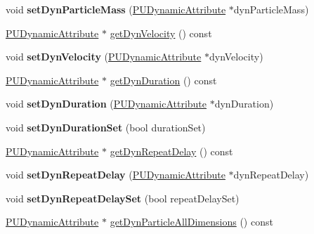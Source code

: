 \begin{DoxyCompactItemize}
\mbox{\label{classPUEmitter_a7bf6c32faf96c75508faa4e94ba8dc62}} 
void {\bfseries set\+Dyn\+Particle\+Mass} (\hyperlink{classPUDynamicAttribute}{P\+U\+Dynamic\+Attribute} $\ast$dyn\+Particle\+Mass)
\item 
\hyperlink{classPUDynamicAttribute}{P\+U\+Dynamic\+Attribute} $\ast$ \hyperlink{classPUEmitter_afebcabddaaa921223bc58a5feffa0e60}{get\+Dyn\+Velocity} () const
\item 
\mbox{\label{classPUEmitter_a68a3f8e9d491aa0468d6a2faba143329}} 
void {\bfseries set\+Dyn\+Velocity} (\hyperlink{classPUDynamicAttribute}{P\+U\+Dynamic\+Attribute} $\ast$dyn\+Velocity)
\item 
\hyperlink{classPUDynamicAttribute}{P\+U\+Dynamic\+Attribute} $\ast$ \hyperlink{classPUEmitter_a08f852003ae3d3532df40b1425b3466e}{get\+Dyn\+Duration} () const
\item 
\mbox{\label{classPUEmitter_a4165cc4319f111235e860ef4d59423b2}} 
void {\bfseries set\+Dyn\+Duration} (\hyperlink{classPUDynamicAttribute}{P\+U\+Dynamic\+Attribute} $\ast$dyn\+Duration)
\item 
\mbox{\label{classPUEmitter_ac270698dbad1b6d1ae466d694f943441}} 
void {\bfseries set\+Dyn\+Duration\+Set} (bool duration\+Set)
\item 
\hyperlink{classPUDynamicAttribute}{P\+U\+Dynamic\+Attribute} $\ast$ \hyperlink{classPUEmitter_a8a5413646ad78e110b420088174fa112}{get\+Dyn\+Repeat\+Delay} () const
\item 
\mbox{\label{classPUEmitter_a2d9b7d6ca7a184e30bdd48f5792b789d}} 
void {\bfseries set\+Dyn\+Repeat\+Delay} (\hyperlink{classPUDynamicAttribute}{P\+U\+Dynamic\+Attribute} $\ast$dyn\+Repeat\+Delay)
\item 
\mbox{\label{classPUEmitter_a81fecb4e7a2134b3aeff21c99edca836}} 
void {\bfseries set\+Dyn\+Repeat\+Delay\+Set} (bool repeat\+Delay\+Set)
\item 
\hyperlink{classPUDynamicAttribute}{P\+U\+Dynamic\+Attribute} $\ast$ \hyperlink{classPUEmitter_ae2ab2e98c032ace3c45634a34d7c37f1}{get\+Dyn\+Particle\+All\+Dimensions} () const
\item 
\mbox{\label{classPUEmitter_aec948d85bfa4464756c9d8b8fb2e2d9e}} 

\end{DoxyCompactItemize}
